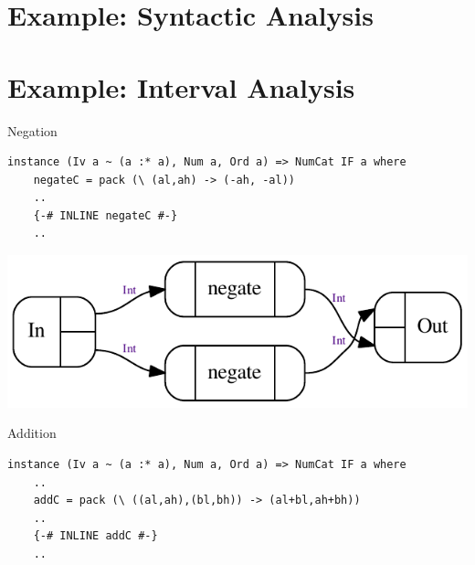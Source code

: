 \documentclass[10pt]{beamer}
\theoremstyle{definition}
\theoremstyle{remark}
\numberwithin{equation}{section}
\begin{document}
\begin{frame}[fragile]{}
\end{frame}

\begin{frame}[fragile]{}
\end{frame}

\begin{frame}[fragile]{}
\end{frame}

\begin{frame}[fragile]{}
\end{frame}

\begin{frame}[fragile]{}
\end{frame}

\section{Example: Syntactic Analysis} %

\begin{frame}[fragile]{}
\end{frame}

\section{Example: Interval Analysis} %

\begin{frame}[fragile]{Negation}
  \begin{lstlisting}[frame=single]
  instance (Iv a ~ (a :* a), Num a, Ord a) => NumCat IF a where
    negateC = pack (\ (al,ah) -> (-ah, -al))
    ..
    {-# INLINE negateC #-}
    ..
  \end{lstlisting}
  \includegraphics{neg-iv.pdf}
\end{frame}

\begin{frame}[fragile]{Addition}
  \begin{lstlisting}[frame=single]
  instance (Iv a ~ (a :* a), Num a, Ord a) => NumCat IF a where
    ..
    addC = pack (\ ((al,ah),(bl,bh)) -> (al+bl,ah+bh))
    ..
    {-# INLINE addC #-}
    ..
  \end{lstlisting}
\end{frame}
\end{document}
